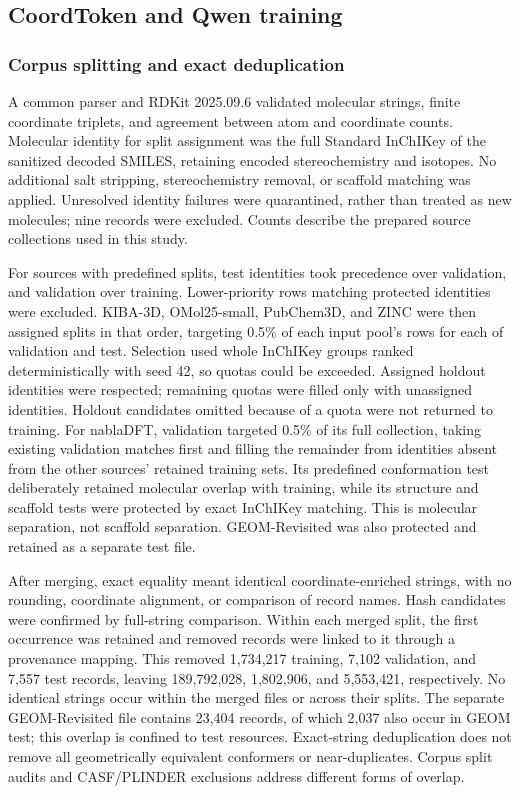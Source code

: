 \subsection*{CoordToken and Qwen training}

\subsubsection*{Corpus splitting and exact deduplication}

A common parser and RDKit 2025.09.6 validated molecular strings, finite coordinate triplets, and
agreement between atom and coordinate counts. Molecular identity for split assignment
was the full Standard InChIKey of the sanitized decoded SMILES, retaining encoded
stereochemistry and isotopes. No additional salt stripping, stereochemistry removal,
or scaffold matching was applied. Unresolved identity failures were quarantined,
rather than treated as new molecules; nine records were excluded. Counts describe
the prepared source collections used in this study.

For sources with predefined splits, test identities took precedence over validation,
and validation over training. Lower-priority rows matching protected identities were
excluded. KIBA-3D, OMol25-small, PubChem3D, and ZINC were then assigned splits in that
order, targeting 0.5\% of each input pool's rows for each of validation and test.
Selection used whole InChIKey groups ranked deterministically with seed 42, so quotas
could be exceeded. Assigned holdout identities were respected; remaining
quotas were filled only with unassigned identities. Holdout candidates omitted because
of a quota were not returned to training. For nablaDFT, validation targeted 0.5\% of its full collection, taking existing
validation matches first and filling the remainder from identities absent from the
other sources' retained training sets. Its predefined conformation test deliberately
retained molecular overlap with training, while its structure and scaffold tests
were protected by exact InChIKey matching. This is molecular separation, not scaffold
separation. GEOM-Revisited was also protected and retained as a separate test file.

After merging, exact equality meant identical coordinate-enriched strings, with no
rounding, coordinate alignment, or comparison of record names. Hash candidates were
confirmed by full-string comparison. Within each merged split, the first occurrence
was retained and removed records were linked to it through a provenance mapping.
This removed 1,734,217 training, 7,102 validation, and 7,557 test records, leaving
189,792,028, 1,802,906, and 5,553,421, respectively. No identical
strings occur within the merged files or across their splits. The separate
GEOM-Revisited file contains 23,404 records, of which 2,037 also occur in GEOM test;
this overlap is confined to test resources. Exact-string deduplication does not remove
all geometrically equivalent conformers or near-duplicates. Corpus split audits and
CASF/PLINDER exclusions address different forms of overlap.


